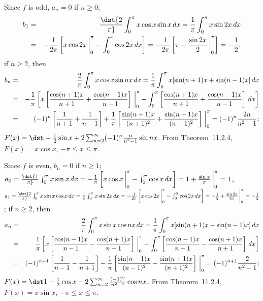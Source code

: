 \documentclass[dvips]{book}
\renewcommand{\exer}[1]{\par\medskip\;\noindent{\color{red}\bf #1.}}
\numberwithin{example}{section}
\numberwithin{equation}{section}
\numberwithin{theorem}{section}
\numberwithin{table}{section}
\numberwithin{figure}{section}
\newcommand{\lims}[2]{\,\bigg|_{#1}^{#2}}
\begin{document}
\exer{11.2.6}
Since $f$ is odd,
$a_n=0$ if $n\ge0$;
\begin{eqnarray*}
b_1&=&\dst{2\over\pi}\int_0^\pi x\cos x\sin x\,dx=
{1\over\pi}\int_0^\pi x\sin2x\,dx\\
&=&-{1\over2\pi}\left[x\cos2x\lims0\pi-\int_0^\pi\cos2x\,dx\right]
=-{1\over2\pi}\left[\pi-{\sin2x\over2}\lims0\pi\right]
=-{1\over2}.
\end{eqnarray*}
 if $n\ge2$, then
\begin{eqnarray*}
b_n&=&{2\over\pi}\int_0^\pi x\cos x\sin nx\,dx=
{1\over\pi}\int_0^\pi x[\sin(n+1)x+\sin(n-1)x]\,dx\\
&=&-{1\over\pi}\left[x\left[{\cos(n+1)x\over n+1}
+{\cos(n-1)x\over n-1}\right]\lims0\pi-
\int_0^\pi\left[{\cos(n+1)x\over
n+1}+{\cos(n-1)x\over n-1}\right]\,dx\right]\\
&=&(-1)^n\left[{1\over n+1}+{1\over n-1}\right]
+{1\over
\pi}\left[{\sin(n+1)x\over(n+1)^2}+{\sin(n-1)x\over(n-1)^2}
\right]\lims0\pi
=(-1)^n{2n\over
n^2-1};
\end{eqnarray*}
 $F(x)=\dst-{1\over2}\sin x+2\sum_{n=2}^\infty(-1)^n
{n\over n^2-1}\sin nx$. From Theorem~11.2.4,
$F(x)=x\cos x$, $-\pi\le x\le\pi$.




\exer{11.2.8}
Since $f$ is even,
$b_n=0$ if $n\ge1$;
$a_0=\dst{1\over\pi}\int_0^\pi x\sin
x\,dx=-{1\over\pi}\left[x\cos x\lims0\pi-\int_0^\pi\cos
x\,dx\right]=1+{\sin x\over\pi}\lims0\pi=1$;
 $a_1=\dst{2\over\pi}\int_0^\pi x\sin x\cos
x\,dx={1\over\pi}\int_0^\pi x\sin2x\,dx=-{1\over2\pi}
\left[x\cos2x\lims0\pi-\int_0^\pi\cos2x\,dx\right]=
-{1\over2}+{\sin2x\over4\pi}\lims0\pi=-{1\over2}$;
 if $n\ge2$, then
\begin{eqnarray*}
a_n&=&{2\over\pi}\int_0^\pi x\sin x\cos nx\,dx=
{1\over\pi}\int_0^\pi x[\sin(n+1)x-\sin(n-1)x]\,dx\\
&=&{1\over\pi}\left[x\left[{\cos(n-1)x\over n-1}
-{\cos(n+1)x\over n+1}\right]\lims0\pi
-\int_0^\pi\left[{\cos(n-1)x\over
n-1}-{\cos(n+1)x\over n+1}\right]\,dx\right]\\
&=&(-1)^{n+1}\left[{1\over n-1}-{1\over n+1}\right]
-{1\over\pi}\left[{\sin(n-1)x\over(n-1)^2}-{\sin(n+1)x\over
(n+1)^2}\right]\lims0\pi=
(-1)^{n+1}{2\over n^2-1};
\end{eqnarray*}
 $F(x)=\dst1-{1\over2}\cos
x-2\sum_{n=2}^\infty
{(-1)^n\over n^2-1}\cos nx$. From Theorem~11.2.4,
$F(x)=x\sin x$, $-\pi\le x\le\pi$.
\end{document}
